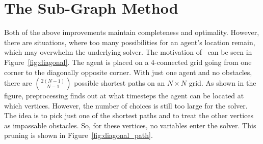 \section{The Sub-Graph Method}
\label{sec:subgraph}


Both of the above improvements maintain completeness and optimality. However, there are situations, where too many possibilities for an agent's location remain, which may overwhelm the underlying solver. The motivation of~\cite{AAMAS_corridors} can be seen in Figure~\ref{fig:diagonal}. The agent is placed on a 4-connected grid going from one corner to the diagonally opposite corner. With just one agent and no obstacles, there are $\binom{2(N-1)}{N-1}$ possible shortest paths on an $N \times N$ grid. As shown in the figure, preprocessing finds out at what timesteps the agent can be located at which vertices. However, the number of choices is still too large for the solver. The idea is to pick just one of the shortest paths and to treat the other vertices as impassable obstacles. So, for these vertices, no variables enter the solver. This pruning is shown in Figure~\ref{fig:diagonal_path}.
%
